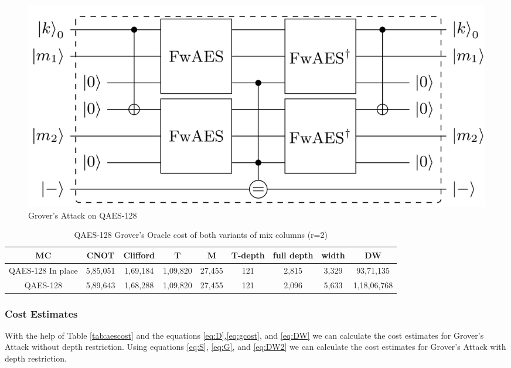 \documentclass[preprint]{transcrypto}
\begin{document}
\begin{figure}[h!]
    \centering
    \includegraphics[width=\linewidth]{aes/aesrov.png}
    \caption{Grover's Attack on QAES-128 \cite{aeslowmc}}
    \label{fig:aesgrov}
\end{figure}

\begin{center}
\begin{table}[h!]
    \centering
    \begin{tabular}{ |c|c|c|c|c|c|c|c|c| } 
     \hline
     MC & CNOT & Clifford & T & M & T-depth & full depth & width & DW \\ \hline
    QAES-128 In place  & 5,85,051&1,69,184&1,09,820&27,455&121&2,815&3,329&93,71,135 \\ \hline
     QAES-128 \cite{aesmc} & 5,89,643&1,68,288&1,09,820&27,455&121&2,096&5,633&1,18,06,768  \\ \hline
    \end{tabular}
    \caption{QAES-128 Grover's Oracle cost of both variants of mix columns (r=2)}
    \label{tab:aesgrovcost}
\end{table}
\end{center}

\subsubsection{Cost Estimates}
With the help of Table \ref{tab:aescost} and the equations \ref{eq:D},\ref{eq:gcost}, and \ref{eq:DW} we can calculate the cost estimates for Grover's Attack without depth restriction. Using equations \ref{eq:S}, \ref{eq:G}, and \ref{eq:DW2} we can calculate the cost estimates for Grover's Attack with depth restriction.
\end{document}
